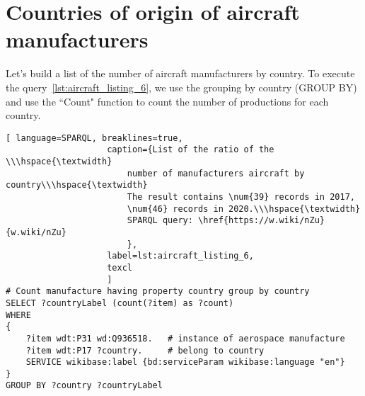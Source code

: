 
\section{Countries of origin of aircraft manufacturers}

Let's build a list of the number of aircraft manufacturers by country. To execute the query~\ref{lst:aircraft_listing_6}, we use the grouping 
by country (GROUP BY) and use the ``Count" function to count the number of productions for each country.

\label{question:aircraft_question_3}

\begin{lstlisting}[ language=SPARQL, breaklines=true, 
                    caption={List of the ratio of the \\\hspace{\textwidth} 
						number of manufacturers aircraft by country\\\hspace{\textwidth}
                        The result contains \num{39} records in 2017, 
                        \num{46} records in 2020.\\\hspace{\textwidth}
                        SPARQL query: \href{https://w.wiki/nZu}{w.wiki/nZu}
                        },
                    label=lst:aircraft_listing_6,
                    texcl 
                    ]
# Count manufacture having property country group by country
SELECT ?countryLabel (count(?item) as ?count)
WHERE
{
    ?item wdt:P31 wd:Q936518.   # instance of aerospace manufacture
    ?item wdt:P17 ?country.     # belong to country
    SERVICE wikibase:label {bd:serviceParam wikibase:language "en"}
}
GROUP BY ?country ?countryLabel 
\end{lstlisting}


